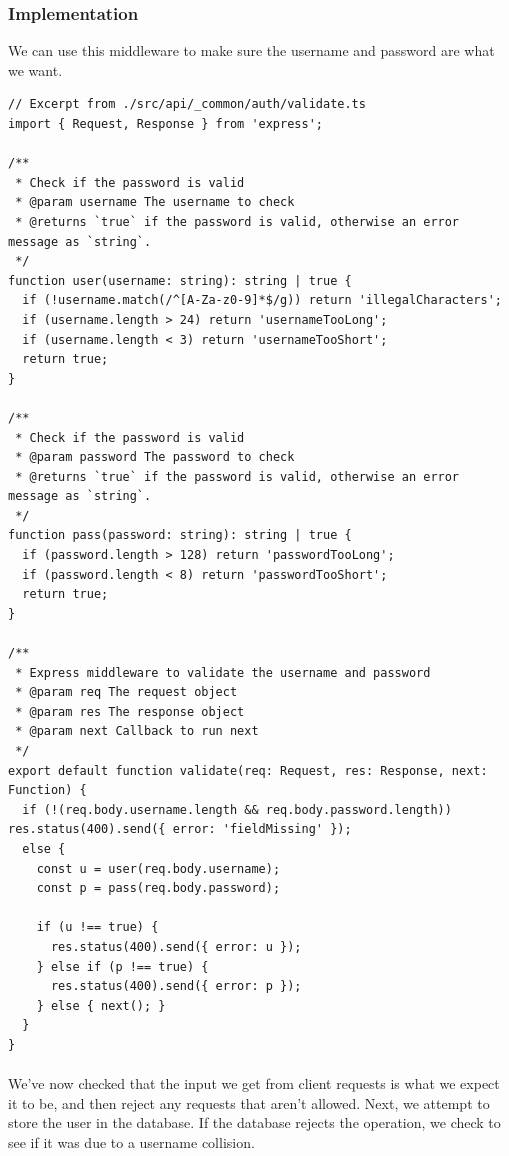 \documentclass{report}
\begin{document}
\subsubsection{Implementation}
We can use this middleware to make sure the username and password are what we want.
\begin{verbatim}
// Excerpt from ./src/api/_common/auth/validate.ts
import { Request, Response } from 'express';

/**
 * Check if the password is valid
 * @param username The username to check
 * @returns `true` if the password is valid, otherwise an error message as `string`.
 */
function user(username: string): string | true {
  if (!username.match(/^[A-Za-z0-9]*$/g)) return 'illegalCharacters';
  if (username.length > 24) return 'usernameTooLong';
  if (username.length < 3) return 'usernameTooShort';
  return true;
}

/**
 * Check if the password is valid
 * @param password The password to check
 * @returns `true` if the password is valid, otherwise an error message as `string`.
 */
function pass(password: string): string | true {
  if (password.length > 128) return 'passwordTooLong';
  if (password.length < 8) return 'passwordTooShort';
  return true;
}

/**
 * Express middleware to validate the username and password
 * @param req The request object
 * @param res The response object
 * @param next Callback to run next
 */
export default function validate(req: Request, res: Response, next: Function) {
  if (!(req.body.username.length && req.body.password.length)) res.status(400).send({ error: 'fieldMissing' });
  else {
    const u = user(req.body.username);
    const p = pass(req.body.password);

    if (u !== true) {
      res.status(400).send({ error: u });
    } else if (p !== true) {
      res.status(400).send({ error: p });
    } else { next(); }
  }
}

\end{verbatim}

\paragraph{}
We've now checked that the input we get from client requests is what we expect it to be, and then reject any requests that aren't allowed. Next, we attempt to store the user in the database. If the database rejects the operation, we check to see if it was due to a username collision. 
\end{document}
